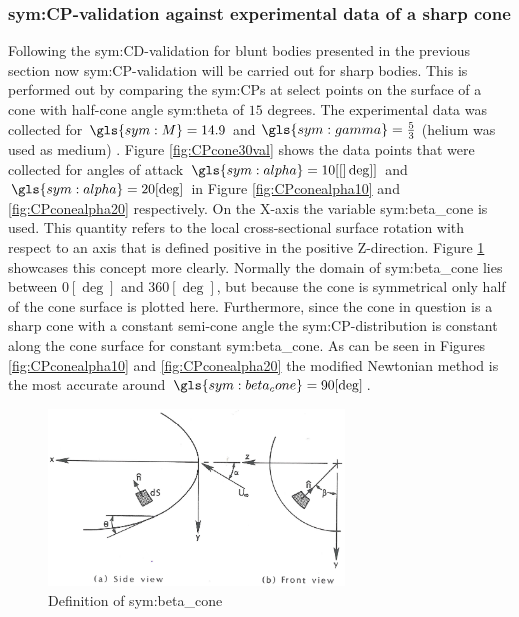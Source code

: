 \subsubsection{\gls{sym:CP}-validation against experimental data of a sharp cone}
\label{subsubsec:valsharpconeCP}
Following the \gls{sym:CD}-validation for blunt bodies presented in the previous section now \gls{sym:CP}-validation will be carried out for sharp bodies. This is performed out by comparing the \glspl{sym:CP} at select points on the surface of a cone with half-cone angle \gls{sym:theta} of $15$ degrees. The experimental data was collected for $\gls{sym:M}=14.9$ and $\gls{sym:gamma}=\frac{5}{3}$ (helium was used as medium) \cite{Bertin1994,Cleary1970}. Figure \ref{fig:CPcone30val} shows the data points that were collected for angles of attack $\gls{sym:alpha}=10[[]\deg]]$ and $\gls{sym:alpha}=20[\deg]$ in Figure \ref{fig:CPconealpha10} and \ref{fig:CPconealpha20} respectively. On the X-axis the variable \gls{sym:beta_cone} is used. This quantity refers to the local cross-sectional surface rotation with respect to an axis that is defined positive in the positive Z-direction. Figure \ref{fig:beta_cone} showcases this concept more clearly. Normally the domain of \gls{sym:beta_cone} lies between $0[\deg]$ and $360[\deg]$, but because the cone is symmetrical only half of the cone surface is plotted here. Furthermore, since the cone in question is a sharp cone with a constant semi-cone angle the \gls{sym:CP}-distribution is constant along the cone surface for constant \gls{sym:beta_cone}.
As can be seen in Figures \ref{fig:CPconealpha10} and \ref{fig:CPconealpha20} the modified Newtonian method is the most accurate around $\gls{sym:beta_cone}=90[\deg]$.

\begin{figure}[h]
	\centering
	\includegraphics[width=0.7\textwidth]{./Figure/def_beta}
	\caption{Definition of \gls{sym:beta_cone} \cite{Bertin1994}}
	\label{fig:beta_cone}
\end{figure}

